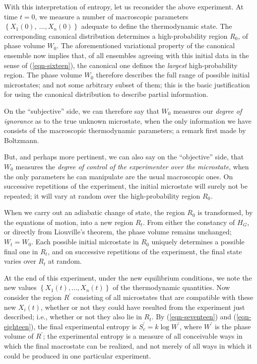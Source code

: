 \documentclass[twocolumn]{article}
\begin{document}
With this interpretation of entropy, let us reconsider the above
experiment. At time \(t = 0\), we measure a number of macroscopic
parameters \(\left\{ X_{1}\left( 0 \right),\ \ldots,X_{n}(0) \right\}\)
adequate to define the thermodynamic state. The corresponding canonical
distribution determines a high-probability region \(R_{0}\)\emph{,} of
phase volume \(W_{0}\). The aforementioned variational property of the
canonical ensemble now implies that, of all ensembles agreeing with this
initial data in the sense of (\ref{eqn-sixteen}), the canonical one defines the
\emph{largest} high-probability region. The phase volume \(W_{0}\)
therefore describes the full range of possible initial microstates; and
not some arbitrary subset of them; this is the basic justification for
using the canonical distribution to describe partial information.

On the ``subjective'' side, we can therefore say that \(W_{0}\) measures
our \emph{degree of ignorance} as to the true unknown microstate, when
the only information we have consists of the macroscopic thermodynamic
parameters; a remark first made by Boltzmann.

But, and perhaps more pertinent, we can also say on the ``objective''
side, that \(W_{0}\) measures the \emph{degree of control of the
experimenter over the microstate}, when the only parameters he can
manipulate are the usual macroscopic ones. On successive repetitions of
the experiment, the initial microstate will surely not be repeated; it
will vary at random over the high-probability region \(R_{0}\)\emph{.}

When we carry out an adiabatic change of state, the region \(R_{0}\) is
transformed, by the equations of motion, into a new region
\(R_{t}\). From either the constancy of
\(H_{G}\), or directly from Liouville's theorem, the
phase volume remains unchanged; \(W_{t} = W_{0}\). Each possible
initial microstate in \(R_{0}\) uniquely determines a possible final one
in \(R_{t}\), and on successive repetitions of the experiment, the final
state varies over \(R_{t}\) at random.

At the end of this experiment, under the new equilibrium conditions, we
note the new values
\(\left\{ X_{1}\left( t \right),\ldots,X_{n}\left( t \right) \right\}\)
of the thermodynamic quantities. Now consider the region \(R^{\prime}\)
consisting of all microstates that are compatible with these new
\(X_{i}\left( t \right)\), whether or not they could have resulted from
the experiment just described; i.e., whether or not they also lie in
\(R_{t}\). By (\ref{eqn-seventeen}) and (\ref{eqn-eighteen}), the final experimental entropy is
\(S_{c}^{\prime} = k\log{W^{\prime}}\), where \(W^{\prime}\) is the phase volume of \(R^{\prime}\);
the experimental entropy is a measure of all conceivable ways in which
the final macrostate can be realized, and not merely of all ways in
which it could be produced in one particular experiment.
\end{document}
